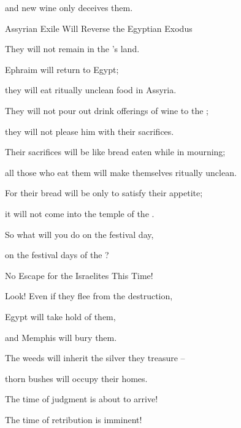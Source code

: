 {\par }{\Q and new wine
only deceives them.
\par }{\SH Assyrian Exile Will Reverse the Egyptian Exodus
\par }{\Q {}They will not
remain
in the
{}’s
land.
\par }{\Q Ephraim
will return
to Egypt;
\par }{\Q they will eat
ritually unclean
food in Assyria.
\par }{\Q {}They will not
pour
out drink offerings of wine
to the
{};
\par }{\Q they will not
please
him with their sacrifices.
\par }{\Q Their sacrifices will be like bread
eaten while in mourning;
\par }{\Q all
those who eat
them will make themselves ritually unclean.
\par }{\Q For
their bread
will be only to satisfy their appetite;
\par }{\Q it will not
come
into the temple
of the {}.
\par }{\Q {}So what
will you do
on
the festival
day,
\par }{\Q on the festival
days
of the {}?
\par }{\SH No Escape for the Israelites This Time!
\par }{\Q {}Look! Even if
they flee
from the destruction,
\par }{\Q Egypt
will take hold of them,
\par }{\Q and Memphis
will bury
them.
\par }{\Q The weeds
will inherit the silver they treasure –
\par }{\Q thorn bushes will occupy their homes.
\par }{\Q {}The time
of judgment
is about to arrive!

\par }{\Q The time
of retribution
is imminent!

}
